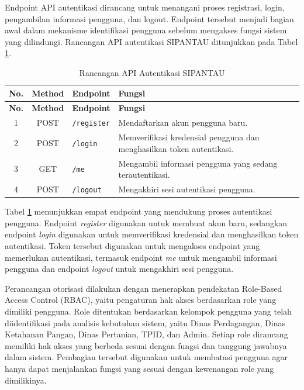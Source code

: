 Endpoint API autentikasi dirancang untuk menangani proses registrasi, login, pengambilan informasi pengguna, dan logout. Endpoint tersebut menjadi bagian awal dalam mekanisme identifikasi pengguna sebelum mengakses fungsi sistem yang dilindungi. Rancangan API autentikasi SIPANTAU ditunjukkan pada Tabel \ref{tab:api-autentikasi}.

\begin{longtable}{|c|c|p{3.2cm}|p{6cm}|}
\caption{Rancangan API Autentikasi SIPANTAU}
\label{tab:api-autentikasi} \\

\hline
\textbf{No.} & \textbf{Method} & \textbf{Endpoint} & \textbf{Fungsi} \\
\hline
\endfirsthead

\hline
\textbf{No.} & \textbf{Method} & \textbf{Endpoint} & \textbf{Fungsi} \\
\hline
\endhead

1 & POST & \texttt{/register} &
Mendaftarkan akun pengguna baru. \\ \hline

2 & POST & \texttt{/login} &
Memverifikasi kredensial pengguna dan menghasilkan token autentikasi. \\ \hline

3 & GET & \texttt{/me} &
Mengambil informasi pengguna yang sedang terautentikasi. \\ \hline

4 & POST & \texttt{/logout} &
Mengakhiri sesi autentikasi pengguna. \\ \hline

\end{longtable}

Tabel \ref{tab:api-autentikasi} menunjukkan empat endpoint yang mendukung proses autentikasi pengguna. Endpoint \textit{register} digunakan untuk membuat akun baru, sedangkan endpoint \textit{login} digunakan untuk memverifikasi kredensial dan menghasilkan token autentikasi. Token tersebut digunakan untuk mengakses endpoint yang memerlukan autentikasi, termasuk endpoint \textit{me} untuk mengambil informasi pengguna dan endpoint \textit{logout} untuk mengakhiri sesi pengguna.

Perancangan otorisasi dilakukan dengan menerapkan pendekatan Role-Based Access Control (RBAC), yaitu pengaturan hak akses berdasarkan role yang dimiliki pengguna. Role ditentukan berdasarkan kelompok pengguna yang telah diidentifikasi pada analisis kebutuhan sistem, yaitu Dinas Perdagangan, Dinas Ketahanan Pangan, Dinas Pertanian, TPID, dan Admin. Setiap role dirancang memiliki hak akses yang berbeda sesuai dengan fungsi dan tanggung jawabnya dalam sistem. Pembagian tersebut digunakan untuk membatasi pengguna agar hanya dapat menjalankan fungsi yang sesuai dengan kewenangan role yang dimilikinya.

